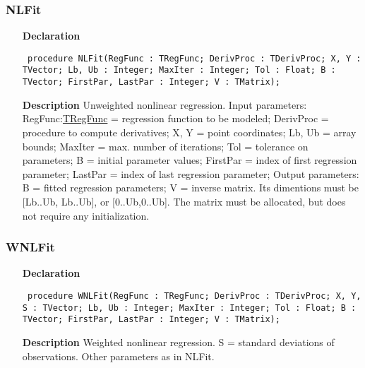 \documentclass[12pt,a4paper,oneside]{report}
\newcommand{\declarationitem}[1]{\textbf{#1}}
\newcommand{\descriptiontitle}[1]{\textbf{#1}}
\newcommand{\code}[1]{\texttt{#1}}
\begin{document}
\subsubsection{NLFit}
\label{unlfit-NLFit}
\begin{itemize}\item[\declarationitem{Declaration}\hfill]
	\begin{flushleft}
		\code{
			procedure NLFit(RegFunc : TRegFunc; DerivProc : TDerivProc; X, Y : TVector; Lb, Ub : Integer; MaxIter : Integer; Tol : Float; B : TVector; FirstPar, LastPar : Integer; V : TMatrix);}
	\end{flushleft}
	\item[\descriptiontitle{Description}]
	Unweighted nonlinear regression. Input parameters: RegFunc:\hyperref[utypes-TRegFunc]{TRegFunc} = regression function to be modeled; DerivProc = procedure to compute derivatives; X, Y = point coordinates; Lb, Ub = array bounds; MaxIter = max. number of iterations; Tol = tolerance on parameters; B = initial parameter values; FirstPar = index of first regression parameter; LastPar = index of last regression parameter; Output parameters: B = fitted regression parameters; V = inverse matrix. Its dimentions must be [Lb..Ub, Lb..Ub], or [0..Ub,0..Ub]. The matrix must be allocated, but does not require any initialization.
\end{itemize}
\subsubsection{WNLFit}
\label{unlfit-WNLFit}
\begin{itemize}\item[\declarationitem{Declaration}\hfill]
	\begin{flushleft}
		\code{
			procedure WNLFit(RegFunc : TRegFunc; DerivProc : TDerivProc; X, Y, S : TVector; Lb, Ub : Integer; MaxIter : Integer; Tol : Float; B : TVector; FirstPar, LastPar : Integer; V : TMatrix);}
		
	\end{flushleft}
	
	\par
	\item[\descriptiontitle{Description}]
	Weighted nonlinear regression. S = standard deviations of observations. Other parameters as in NLFit.
	
\end{itemize}
\end{document}
